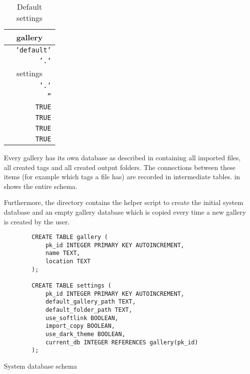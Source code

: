 \begin{table}[!h]
	\centering
	\begin{tabular}{lr}
		\toprule
		\multicolumn{2}{c}{gallery} \\
		\midrule
		\tfcode{name} & \texttt{'default'} \\
		\tfcode{location} & \texttt{'.'} \\
		\toprule
		\multicolumn{2}{c}{settings} \\
		\midrule
		\tfcode{default_gallery_path} & \texttt{'.'} \\
		\tfcode{default_folder_path} & \texttt{''} \\
		\tfcode{use_softlink} & \texttt{TRUE} \\
		\tfcode{import_copy} & \texttt{TRUE} \\
		\tfcode{use_dark_theme} & \texttt{TRUE} \\
		\tfcode{current_db} & \texttt{TRUE} \\
		\bottomrule
	\end{tabular}
	\caption{Default settings}
\end{table}

Every gallery has its own database as described in 
containing all imported files, all created tags and all created output folders.
The connections between these items (for example which tags a file has) are
recorded in intermediate tables.  in
 shows the entire schema.

Furthermore, the directory contains the helper script  to
create the initial system database and an empty gallery database which is
copied every time a new gallery is created by the user.

\begin{listing}[!ht]
	\begin{verbatim}
		CREATE TABLE gallery (
			pk_id INTEGER PRIMARY KEY AUTOINCREMENT,
			name TEXT,
			location TEXT
		);

		CREATE TABLE settings (
			pk_id INTEGER PRIMARY KEY AUTOINCREMENT,
			default_gallery_path TEXT,
			default_folder_path TEXT,
			use_softlink BOOLEAN,
			import_copy BOOLEAN,
			use_dark_theme BOOLEAN,
			current_db INTEGER REFERENCES gallery(pk_id)
		);
	\end{verbatim}
	\caption{System database schema}
	\label{lst:db:system}
\end{listing}

